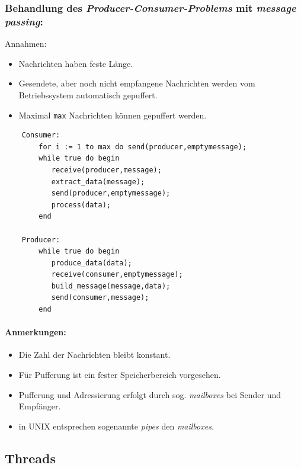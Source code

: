 \documentclass[11pt]{article}
\begin{document}
\subsubsection*{Behandlung des \emph{Producer-Consumer-Problems} mit \emph{message passing}:}
\label{sec:org55e7e97}

Annahmen:
\begin{itemize}
\item Nachrichten haben feste Länge.
\item Gesendete, aber noch nicht empfangene Nachrichten werden vom
Betriebssystem automatisch gepuffert.
\item Maximal \texttt{max} Nachrichten können gepuffert werden.
\end{itemize}

\begin{verbatim}
    Consumer:
        for i := 1 to max do send(producer,emptymessage);
        while true do begin
           receive(producer,message);
           extract_data(message);
           send(producer,emptymessage);
           process(data);
        end

    Producer:
        while true do begin
           produce_data(data);
           receive(consumer,emptymessage);
           build_message(message,data);
           send(consumer,message);
        end
\end{verbatim}

\paragraph*{Anmerkungen:}
\label{sec:orgcd92d66}
\begin{itemize}
\item Die Zahl der Nachrichten bleibt konstant.
\item Für Pufferung ist ein fester Speicherbereich vorgesehen.
\item Pufferung und Adressierung erfolgt durch sog. \emph{mailboxes} bei Sender
und Empfänger.
\item in UNIX entsprechen sogenannte \emph{pipes} den \emph{mailboxes}.
\end{itemize}

\subsection*{Threads}
\label{sec:org47c049d}
\end{document}
